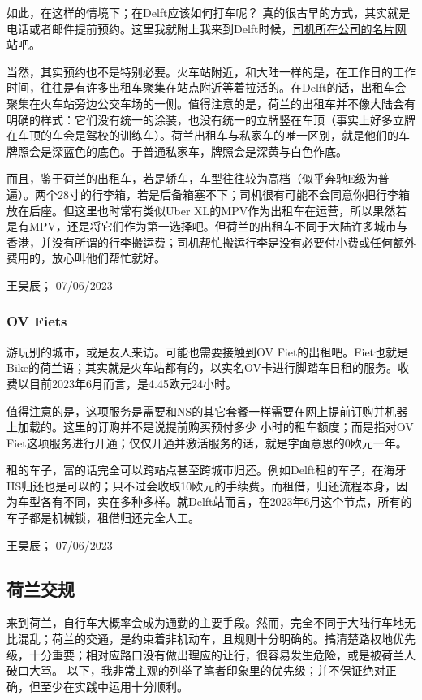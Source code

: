 如此，在这样的情境下；在Delft应该如何打车呢？ 真的很古早的方式，其实就是电话或者邮件提前预约。这里我就附上我来到Delft时候，\href{https://taxidelfland.nl/}{\uline{司机所在公司的名片网站吧}}。

当然，其实预约也不是特别必要。火车站附近，和大陆一样的是，在工作日的工作时间，往往是有许多出租车聚集在站点附近等着拉活的。在Delft的话，出租车会聚集在火车站旁边公交车场的一侧。值得注意的是，荷兰的出租车并不像大陆会有明确的样式：它们没有统一的涂装，也没有统一的立牌竖在车顶（事实上好多立牌在车顶的车会是驾校的训练车）。荷兰出租车与私家车的唯一区别，就是他们的车牌照会是深蓝色的底色。于普通私家车，牌照会是深黄与白色作底。

而且，鉴于荷兰的出租车，若是轿车，车型往往较为高档（似乎奔驰E级为普遍）。两个28寸的行李箱，若是后备箱塞不下；司机很有可能不会同意你把行李箱放在后座。但这里也时常有类似Uber XL的MPV作为出租车在运营，所以果然若是有MPV，还是将它们作为第一选择吧。但荷兰的出租车不同于大陆许多城市与香港，并没有所谓的行李搬运费；司机帮忙搬运行李是没有必要付小费或任何额外费用的，放心叫他们帮忙就好。
\begin{flushright}
王昊辰； 07/06/2023
\end{flushright}

\subsubsection{OV Fiets}
游玩别的城市，或是友人来访。可能也需要接触到OV Fiet的出租吧。Fiet也就是Bike的荷兰语；其实就是火车站都有的，以实名OV卡进行脚踏车日租的服务。收费以目前2023年6月而言，是4.45欧元24小时。

值得注意的是，这项服务是需要和NS的其它套餐一样需要在网上提前订购并机器上加载的。这里的订购并不是说提前购买预付多少
小时的租车额度；而是指对OV Fiet这项服务进行开通；仅仅开通并激活服务的话，就是字面意思的0欧元一年。

租的车子，富的话完全可以跨站点甚至跨城市归还。例如Delft租的车子，在海牙HS归还也是可以的；只不过会收取10欧元的手续费。而租借，归还流程本身，因为车型各有不同，实在多种多样。就Delft站而言，在2023年6月这个节点，所有的车子都是机械锁，租借归还完全人工。
\begin{flushright}
王昊辰； 07/06/2023
\end{flushright}

\vspace{\betsubsec} %
\subsection{荷兰交规}
来到荷兰，自行车大概率会成为通勤的主要手段。然而，完全不同于大陆行车地无比混乱；荷兰的交通，是约束着非机动车，且规则十分明确的。搞清楚路权地优先级，十分重要；相对应路口没有做出理应的让行，很容易发生危险，或是被荷兰人破口大骂。 以下，我非常主观的列举了笔者印象里的优先级；并不保证绝对正确，但至少在实践中运用十分顺利。

